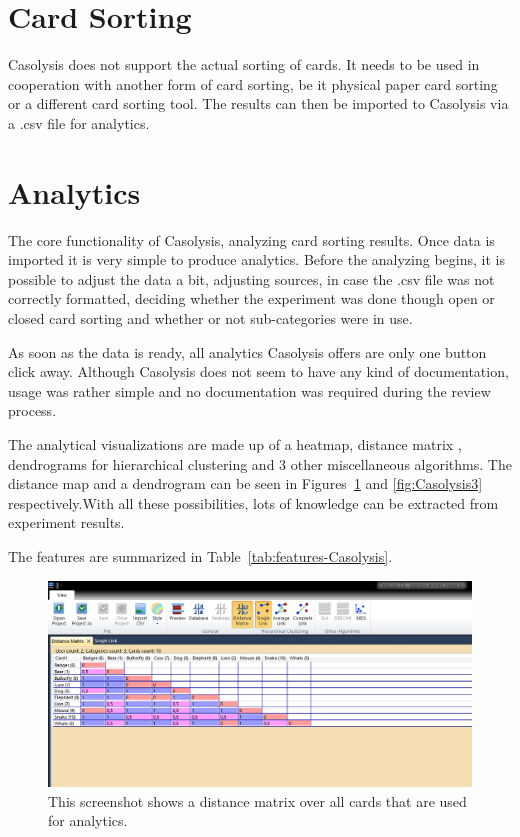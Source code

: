 \section{Card Sorting}
Casolysis does not support the actual sorting of cards. It needs to be
used in cooperation with another form of card sorting, be it physical
paper card sorting or a different card sorting tool. The results can
then be imported to Casolysis via a .csv file for analytics.

\section{Analytics}
The core functionality of Casolysis, analyzing card sorting results.
Once data is imported it is very simple to produce analytics. Before
the analyzing begins, it is possible to adjust the data a bit, adjusting
sources, in case the .csv file was not correctly formatted, deciding
whether the experiment was done though open or closed card sorting and
whether or not sub-categories were in use.

As soon as the data is ready, all analytics Casolysis offers are only
one button click away. Although Casolysis does not seem to have any 
kind of documentation, usage was rather simple and no documentation was
required during the review process.

The analytical visualizations are made up of a heatmap, distance
matrix , dendrograms for hierarchical clustering and 3 other
miscellaneous  algorithms. The distance map and a dendrogram can be
seen in Figures~\ref{fig:Casolysis2} and \ref{fig:Casolysis3}
respectively.With all these possibilities, lots of knowledge can be
extracted from experiment results.

The features are summarized in Table~\ref{tab:features-Casolysis}.

\begin{figure}[tp] 
\centering
\includegraphics[keepaspectratio,width=\linewidth,height=\halfh]{images/casolysis-diagram-1.png}
\caption[Casolysis Distance Matrix] { This screenshot shows a distance
matrix over all cards that are used for analytics.
 }
\label{fig:Casolysis2}
\end{figure}


